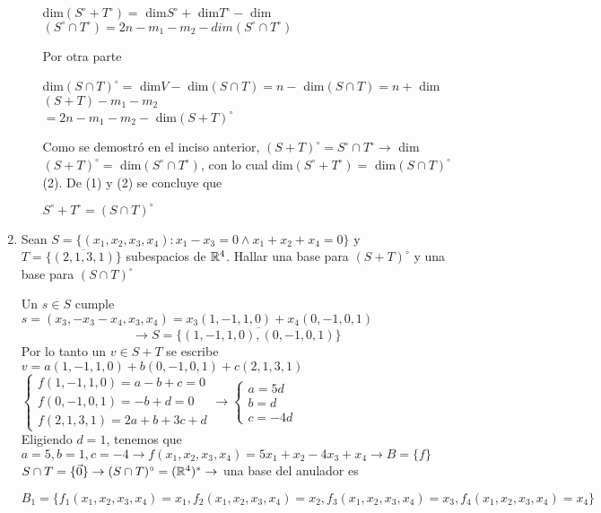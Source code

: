 \begin{enumerate}
\begin{enumerate}
\begin{mdframed}[style=s]
                        \begin{tightcenter}
                            dim$(S^\circ +T^\circ)=$ dim$S^\circ+$ dim$T^\circ-$ dim$(S^\circ \cap T^\circ)=2n-m_1-m_2-dim(S^\circ \cap T^\circ)$
                        \end{tightcenter}
                        Por otra parte
                        \begin{tightcenter}
                            dim$(S\cap T)^\circ=$ dim$V-$ dim$(S\cap T)=n-$ dim$(S\cap T)=n+$ dim$(S+T)-m_1-m_2$\\$=2n-m_1-m_2-$ dim$(S+T)^\circ$
                        \end{tightcenter}
                        Como se demostró en el inciso anterior, $(S+T)^\circ = S^\circ\cap T^\circ\to$ dim $(S+T)^\circ=$ dim$(S^\circ\cap T^\circ)$, con lo cual dim$(S^\circ +T^\circ)=$ dim$(S\cap T)^\circ$(2). De (1) y (2) se concluye que
                        \begin{tightcenter}
                            $S^\circ +T^\circ=(S\cap T)^\circ$
                        \end{tightcenter}
                    \end{mdframed}
            \end{enumerate}
        \item Sean $S=\{(x_1,x_2,x_3,x_4):x_1-x_3=0\land x_1+x_2+x_4=0\}$ y $T=\overline{\{(2,1,3,1)\}}$ subespacios de $\mathbb{R}^4$. Hallar una base para $(S+T)^\circ$ y una base para $(S\cap T)^\circ$
            \begin{mdframed}[style=s]
                Un $s\in S$ cumple $s=(x_3,-x_3-x_4,x_3,x_4)=x_3(1,-1,1,0)+x_4(0,-1,0,1)$
                \[\to S=\overline{\{(1,-1,1,0),(0,-1,0,1)\}}\]
                Por lo tanto un $v\in S+T$ se escribe $v=a(1,-1,1,0)+b(0,-1,0,1)+c(2,1,3,1)$\\
                $\begin{cases}
                    f(1,-1,1,0)=a-b+c=0\\
                    f(0,-1,0,1)=-b+d=0\\
                    f(2,1,3,1)=2a+b+3c+d
                \end{cases}\to\begin{cases}
                    a=5d\\
                    b=d\\
                    c=-4d
                \end{cases}$\\
                Eligiendo $d=1$, tenemos que $a=5,b=1,c=-4\to f(x_1,x_2,x_3,x_4)=5x_1+x_2-4x_3+x_4\to B=\{f\}$
                $S\cap T=\{\vec{0}\}\to (S\cap T)^\circ=(\mathbb{R}^4)^*\to$ una base del anulador es
                \begin{tightcenter}
                    $B_1=\{f_1(x_1,x_2,x_3,x_4)=x_1,f_2(x_1,x_2,x_3,x_4)=x_2,f_3(x_1,x_2,x_3,x_4)=x_3,f_4(x_1,x_2,x_3,x_4)=x_4\}$
                \end{tightcenter}
            \end{mdframed}
    \end{enumerate}